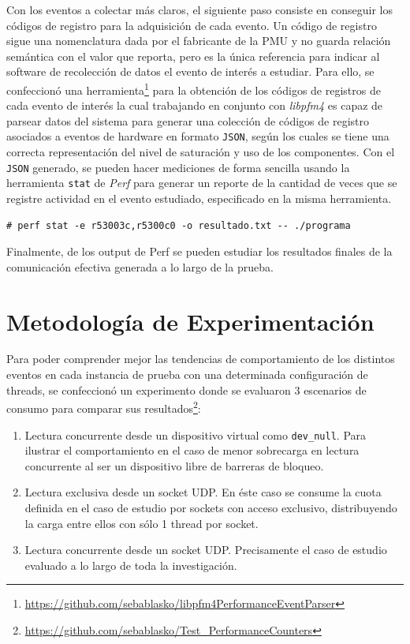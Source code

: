 Con los eventos a colectar más claros, el siguiente paso consiste en conseguir los códigos de registro para la adquisición de cada evento. Un código de registro sigue una nomenclatura dada por el fabricante de la PMU y no guarda relación semántica con el valor que reporta, pero es la única referencia para indicar al software de recolección de datos el evento de interés a estudiar. Para ello, se confeccionó una herramienta\footnote{\url{https://github.com/sebablasko/libpfm4PerformanceEventParser}} para la obtención de los códigos de registros de cada evento de interés la cual trabajando en conjunto con \emph{libpfm4} es capaz de parsear datos del sistema para generar una colección de códigos de registro asociados a eventos de hardware en formato \verb=JSON=, según los cuales se tiene una correcta representación del nivel de saturación y uso de los componentes. Con el \verb=JSON= generado, se pueden hacer mediciones de forma sencilla usando la herramienta \verb=stat= de \emph{Perf} para generar un reporte de la cantidad de veces que se registre actividad en el evento estudiado, especificado en la misma herramienta.

\vspace{1pc}
\begin{lstlisting}[style=BashInputStyle, breaklines=true, captionpos=b, caption={Ejemplo de uso de Perf para colectar datos de una colección de eventos. En éste caso se configura para colectar datos de 2 eventos y dejar el reporte en un archivo de salida.}]
	# perf stat -e r53003c,r5300c0 -o resultado.txt -- ./programa
\end{lstlisting}

Finalmente, de los output de Perf se pueden estudiar los resultados finales de la comunicación efectiva generada a lo largo de la prueba.

\section{Metodología de Experimentación}
Para poder comprender mejor las tendencias de comportamiento de los distintos eventos en cada instancia de prueba con una determinada configuración de threads, se confeccionó un experimento donde se evaluaron 3 escenarios de consumo para comparar sus resultados\footnote{\url{https://github.com/sebablasko/Test_PerformanceCounters}}:

\begin{enumerate}
\item Lectura concurrente desde un dispositivo virtual como \verb=dev_null=. Para ilustrar el comportamiento en el caso de menor sobrecarga en lectura concurrente al ser un dispositivo libre de barreras de bloqueo.
\item Lectura exclusiva desde un socket UDP. En éste caso se consume la cuota definida en el caso de estudio por sockets con acceso exclusivo, distribuyendo la carga entre ellos con sólo 1 thread por socket. 
\item Lectura concurrente desde un socket UDP. Precisamente el caso de estudio evaluado a lo largo de toda la investigación.
\end{enumerate}

